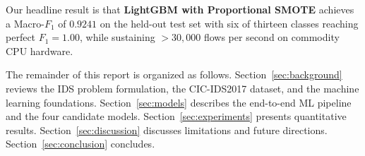 Our headline result is that \textbf{LightGBM with Proportional SMOTE} achieves a Macro-$F_1$ of $0.9241$ on the held-out test set with six of thirteen classes reaching perfect $F_1 = 1.00$, while sustaining $> 30{,}000$ flows per second on commodity CPU hardware.

The remainder of this report is organized as follows. Section~\ref{sec:background} reviews the IDS problem formulation, the CIC-IDS2017 dataset, and the machine learning foundations. Section~\ref{sec:models} describes the end-to-end ML pipeline and the four candidate models. Section~\ref{sec:experiments} presents quantitative results. Section~\ref{sec:discussion} discusses limitations and future directions. Section~\ref{sec:conclusion} concludes.
